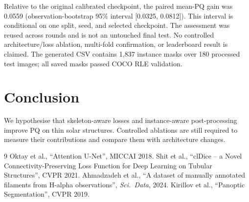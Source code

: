 \documentclass[10pt]{article}
\begin{document}
Relative to the original calibrated checkpoint, the paired mean-PQ gain was
0.0559 (observation-bootstrap 95\% interval [0.0325, 0.0812]). This interval is
conditional on one split, seed, and selected checkpoint. The assessment was
reused across rounds and is not an untouched final test. No controlled
architecture/loss ablation, multi-fold confirmation, or leaderboard result is
claimed. The generated CSV contains 1,837 instance masks over 180 processed
test images; all saved masks passed COCO RLE validation.

\section{Conclusion}
We hypothesise that skeleton-aware losses and instance-aware post-processing
improve PQ on thin solar structures. Controlled ablations are still required
to measure their contributions and compare them with architecture changes.

\begin{thebibliography}{9}
 Oktay et al., ``Attention U-Net'', MICCAI 2018.
 Shit et al., ``clDice -- a Novel Connectivity-Preserving Loss
Function for Deep Learning on Tubular Structures'', CVPR 2021.
 Ahmadzadeh et al., ``A dataset of manually annotated
filaments from H-alpha observations'', \emph{Sci.\ Data}, 2024.
 Kirillov et al., ``Panoptic Segmentation'', CVPR 2019.
\end{thebibliography}
\end{document}
